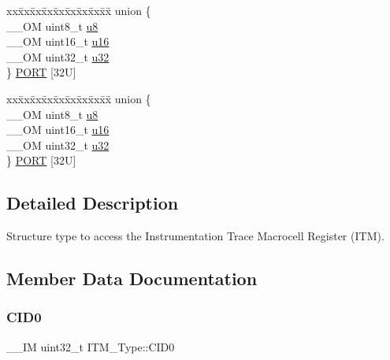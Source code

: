 \begin{DoxyCompactItemize}
\begin{tabbing}
\end{tabbing}\item 
\begin{tabbing}
xx\=xx\=xx\=xx\=xx\=xx\=xx\=xx\=xx\=\kill
union \{\\
\>\_\_OM uint8\_t \mbox{\hyperlink{struct_i_t_m___type_ae773bf9f9dac64e6c28b14aa39f74275}{u8}}\\
\>\_\_OM uint16\_t \mbox{\hyperlink{struct_i_t_m___type_a962a970dfd286cad7f8a8577e87d4ad3}{u16}}\\
\>\_\_OM uint32\_t \mbox{\hyperlink{struct_i_t_m___type_a5834885903a557674f078f3b71fa8bc8}{u32}}\\
\} \mbox{\hyperlink{struct_i_t_m___type_a4ce174a5f5eaaa9a278eea39b42966d9}{PORT}} \mbox{[}32U\mbox{]}\\

\end{tabbing}\item 
\begin{tabbing}
xx\=xx\=xx\=xx\=xx\=xx\=xx\=xx\=xx\=\kill
union \{\\
\>\_\_OM uint8\_t \mbox{\hyperlink{struct_i_t_m___type_ae773bf9f9dac64e6c28b14aa39f74275}{u8}}\\
\>\_\_OM uint16\_t \mbox{\hyperlink{struct_i_t_m___type_a962a970dfd286cad7f8a8577e87d4ad3}{u16}}\\
\>\_\_OM uint32\_t \mbox{\hyperlink{struct_i_t_m___type_a5834885903a557674f078f3b71fa8bc8}{u32}}\\
\} \mbox{\hyperlink{struct_i_t_m___type_a3bf05bf08f89c7cd5b44a333585b19f0}{PORT}} \mbox{[}32U\mbox{]}\\

\end{tabbing}\end{DoxyCompactItemize}


\subsection{Detailed Description}
Structure type to access the Instrumentation Trace Macrocell Register (I\+TM). 

\subsection{Member Data Documentation}
\mbox{\label{struct_i_t_m___type_a30bb2b166b1723867da4a708935677ba}} 
\subsubsection{\texorpdfstring{CID0}{CID0}}
{\footnotesize\ttfamily \+\_\+\+\_\+\+IM uint32\+\_\+t I\+T\+M\+\_\+\+Type\+::\+C\+I\+D0}

